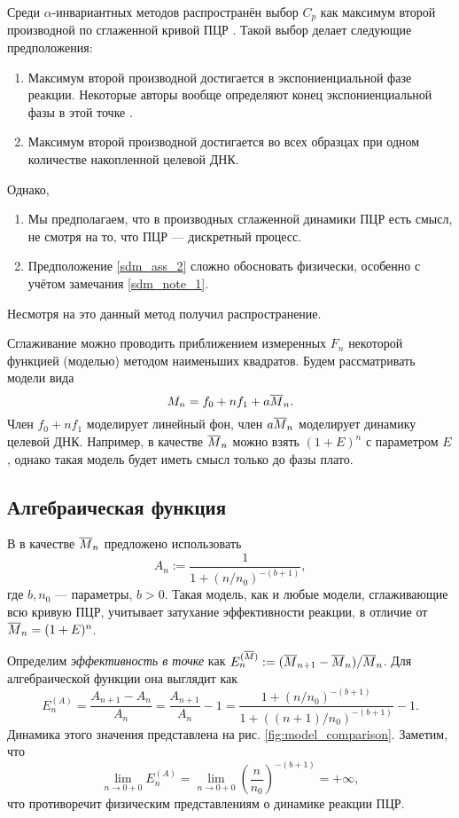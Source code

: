 Среди $\alpha$-инвариантных методов распространён выбор $C_{p}$ как максимум
второй производной по сглаженной кривой ПЦР
\cite{rasmussenQuantificationLightCycler2001}. Такой выбор делает следующие
предположения:
\begin{enumerate}[label=(\alph*)]
  \item{}Максимум второй производной достигается в экспониенциальной фазе
  реакции. Некоторые авторы вообще определяют конец экспониенциальной фазы
  в этой точке \cite{tichopadStandardizedDeterminationRealtime2003,
    zhaoComprehensiveAlgorithmQuantitative2005}.
  \item{}Максимум второй производной достигается во всех образцах при одном
  количестве накопленной целевой ДНК.\label{sdm_ass_2}
\end{enumerate}
Однако,
\begin{enumerate}[label=(\roman*)]
  \item{}Мы предполагаем, что в производных сглаженной динамики ПЦР есть
  смысл, не смотря на то, что ПЦР --- дискретный процесс.\label{sdm_note_1}
  \item{}Предположение \ref{sdm_ass_2} сложно обосновать физически, особенно с
  учётом замечания \ref{sdm_note_1}.\label{sdm_note_2}
\end{enumerate}
Несмотря на это данный метод получил распространение.

Сглаживание можно проводить приближением измеренных $F_{n}$ некоторой функцией
(моделью) методом наименьших квадратов. Будем рассматривать модели вида
\[
  M_{n}=f_0+nf_1+a\overline{M}_{n}.
\]
Член $f_0+nf_1$ моделирует линейный фон, член $a\overline{M}_{n}$ моделирует
динамику целевой ДНК. Например, в качестве $\overline{M}_{n}$ можно взять
$(1+E)^{n}$ с параметром $E$, однако такая модель будет иметь смысл только до
фазы плато.

\subsection{Алгебраическая функция}

В
\cite{tichopadStandardizedDeterminationRealtime2003,zhaoComprehensiveAlgorithmQuantitative2005}
в качестве $\overline{M}_{n}$ предложено использовать
\[
  A_{n}:=\frac{1}{1+(n/n_0)^{-(b+1)}},
\]
где $b,n_0$ --- параметры, $b>0$. Такая модель, как и любые модели,
сглаживающие всю кривую ПЦР, учитывает затухание эффективности реакции, в
отличие от $\overline{M}_{n}=(1+E)^{n}$.

Определим {\it эффективность в точке} как
$E^{(\overline{M})}_{n}:=(\overline{M}_{n+1}-\overline{M}_{n})/\overline{M}_{n}$. Для алгебраической
функции она выглядит как
\[
  E^{(A)}_{n}=\frac{A_{n+1}-A_{n}}{A_{n}}=\frac{A_{n+1}}{A_{n}}-1=
  \frac{1+(n/n_0)^{-(b+1)}}{1+((n+1)/n_0)^{-(b+1)}}-1.
\]
Динамика этого значения представлена на рис. \ref{fig:model_comparison}.
Заметим, что
\[
  \lim_{n\to 0+0}E^{(A)}_{n}=
  \lim_{n\to 0+0}\left(\frac{n}{n_0}\right)^{-(b+1)}=+\infty,
\]
что противоречит физическим представлениям о динамике реакции ПЦР.

